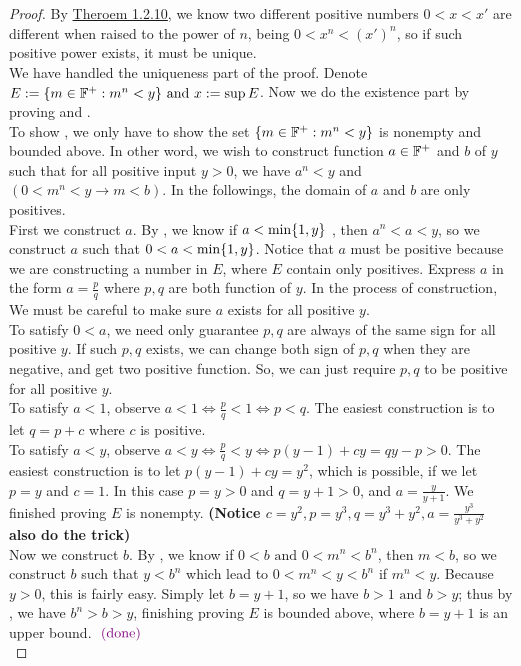 \documentclass{report}
\begin{document}
\begin{proof}
By \hyperref[1.2.10]{Theroem 1.2.10}, we know two different positive numbers $0<x<x'$ are different when raised to the power of $n$, being $0<x^n<(x')^{n}$, so if such positive power exists, it must be unique.\\

We have handled the uniqueness part of the proof. Denote $E:= \{ m \in\mathbb{F}^+: m^n<y \}\text{ and }x:=\sup E$. Now we do the existence part by proving  and  .\\

To show , we only have to show the set $\{ m \in\mathbb{F}^+: m^n<y \}$ is nonempty and bounded above. In other word, we wish to construct function $a\in\mathbb{F}^+$ and $b$ of $y$ such that for all positive input $y>0$, we have $a^n<y$ and $(0<m^n<y\longrightarrow m<b)$. In the followings, the domain of $a$ and $b$ are only positives.\\

First we construct $a$. By , we know if $a<\min \{ 1,y \}$ , then $a^n<a<y$, so we construct $a$ such that $0<a<\min \{ 1,y \}$. Notice that $a$ must be positive because we are constructing a number in $E$, where $E$ contain only positives. Express $a$ in the form  $a=\frac{p}{q}$ where $p,q$ are both function of $y$. In the process of  construction, We must be careful to make sure $a$ exists for all positive $y$.\\

To satisfy $0<a$, we need only guarantee $p,q$ are always of the same sign for all positive $y$. If such $p,q$ exists, we can change both sign of  $p,q$ when they are negative, and get two positive function. So, we can just require $p,q$ to be positive for all positive $y$.\\      

To satisfy $a<1$, observe $a<1\iff \frac{p}{q}<1\iff p<q$. The easiest construction is to let $q=p+c$ where $c$ is positive.\\

To satisfy $a<y$, observe $a<y\iff \frac{p}{q}<y\iff p(y-1)+cy=qy-p>0$. The easiest construction is to let $p(y-1)+cy=y^2$, which is possible, if we let $p=y$ and $c=1$. In this case $p=y>0$ and $q=y+1>0$, and  $a=\frac{y}{y+1}$. We finished proving $E$ is nonempty. \textbf{(Notice $c=y^2,p=y^3,q=y^3+y^2,a=\frac{y^3}{y^3+y^2}$ also do the trick)}\\

Now we construct $b$. By , we know if $0<b\text{ and }0<m^n<b^n$, then $m<b$, so we construct $b$ such that $y<b^n$ which lead to $0<m^n<y<b^n$ if  $m^n<y$. Because $y>0$, this is fairly easy. Simply let $b=y+1$, so we have $b>1\text{ and }b>y$; thus by , we have $b^n>b>y$, finishing proving $E$ is bounded above, where  $b=y+1$ is an upper bound. $\textcolor{violet}{\text{ (done) }}$ \\


\end{proof}
\end{document}
